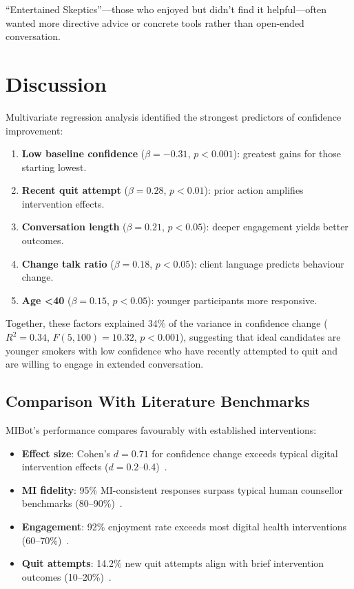 ``Entertained Skeptics''---those who enjoyed but didn't find it helpful---often wanted more directive advice or concrete tools rather than open-ended conversation.


\section{Discussion}
\label{sec:synthesis}



Multivariate regression analysis identified the strongest predictors of confidence improvement:

\begin{enumerate}
	\item \textbf{Low baseline confidence} ($\beta=-0.31$, $p<0.001$): greatest gains for those starting lowest.
	\item \textbf{Recent quit attempt} ($\beta=0.28$, $p<0.01$): prior action amplifies intervention effects.
	\item \textbf{Conversation length} ($\beta=0.21$, $p<0.05$): deeper engagement yields better outcomes.
	\item \textbf{Change talk ratio} ($\beta=0.18$, $p<0.05$): client language predicts behaviour change.
	\item \textbf{Age <40} ($\beta=0.15$, $p<0.05$): younger participants more responsive.
\end{enumerate}

Together, these factors explained 34\% of the variance in confidence change ($R^2=0.34$, $F(5,100)=10.32$, $p<0.001$), suggesting that ideal candidates are younger smokers with low confidence who have recently attempted to quit and are willing to engage in extended conversation.

\subsection*{Comparison With Literature Benchmarks}

MIBot's performance compares favourably with established interventions:

\begin{itemize}
	\item \textbf{Effect size}: Cohen's $d=0.71$ for confidence change exceeds typical digital intervention effects ($d=0.2$--0.4)~\citep{Whittaker2016}.
	\item \textbf{MI fidelity}: 95\% MI-consistent responses surpass typical human counsellor benchmarks (80--90\%)~\citep{Moyers2016}.
	\item \textbf{Engagement}: 92\% enjoyment rate exceeds most digital health interventions (60--70\%)~\citep{Perski2017}.
	\item \textbf{Quit attempts}: 14.2\% new quit attempts align with brief intervention outcomes (10--20\%)~\citep{Stead2013}.
\end{itemize}

